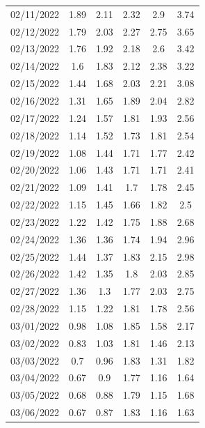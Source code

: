 \documentclass[withoutpreface,bwprint]{cumcmthesis} %
\begin{document}
\begin{appendices}
\begin{table}[]
\begin{tabular}{cccccc}
02/11/2022 & 1.89  & 2.11     & 2.32      & 2.9    & 3.74          \\
02/12/2022 & 1.79  & 2.03     & 2.27      & 2.75   & 3.65          \\
02/13/2022 & 1.76  & 1.92     & 2.18      & 2.6    & 3.42          \\
02/14/2022 & 1.6   & 1.83     & 2.12      & 2.38   & 3.22          \\
02/15/2022 & 1.44  & 1.68     & 2.03      & 2.21   & 3.08          \\
02/16/2022 & 1.31  & 1.65     & 1.89      & 2.04   & 2.82          \\
02/17/2022 & 1.24  & 1.57     & 1.81      & 1.93   & 2.56          \\
02/18/2022 & 1.14  & 1.52     & 1.73      & 1.81   & 2.54          \\
02/19/2022 & 1.08  & 1.44     & 1.71      & 1.77   & 2.42          \\
02/20/2022 & 1.06  & 1.43     & 1.71      & 1.71   & 2.41          \\
02/21/2022 & 1.09  & 1.41     & 1.7       & 1.78   & 2.45          \\
02/22/2022 & 1.15  & 1.45     & 1.66      & 1.82   & 2.5           \\
02/23/2022 & 1.22  & 1.42     & 1.75      & 1.88   & 2.68          \\
02/24/2022 & 1.36  & 1.36     & 1.74      & 1.94   & 2.96          \\
02/25/2022 & 1.44  & 1.37     & 1.83      & 2.15   & 2.98          \\
02/26/2022 & 1.42  & 1.35     & 1.8       & 2.03   & 2.85          \\
02/27/2022 & 1.36  & 1.3      & 1.77      & 2.03   & 2.75          \\
02/28/2022 & 1.15  & 1.22     & 1.81      & 1.78   & 2.56          \\
03/01/2022 & 0.98  & 1.08     & 1.85      & 1.58   & 2.17          \\
03/02/2022 & 0.83  & 1.03     & 1.81      & 1.46   & 2.13          \\
03/03/2022 & 0.7   & 0.96     & 1.83      & 1.31   & 1.82          \\
03/04/2022 & 0.67  & 0.9      & 1.77      & 1.16   & 1.64          \\
03/05/2022 & 0.68  & 0.88     & 1.79      & 1.15   & 1.68          \\
03/06/2022 & 0.67  & 0.87     & 1.83      & 1.16   & 1.63          \\

\end{tabular}
\end{table}
\end{appendices}
\end{document}
